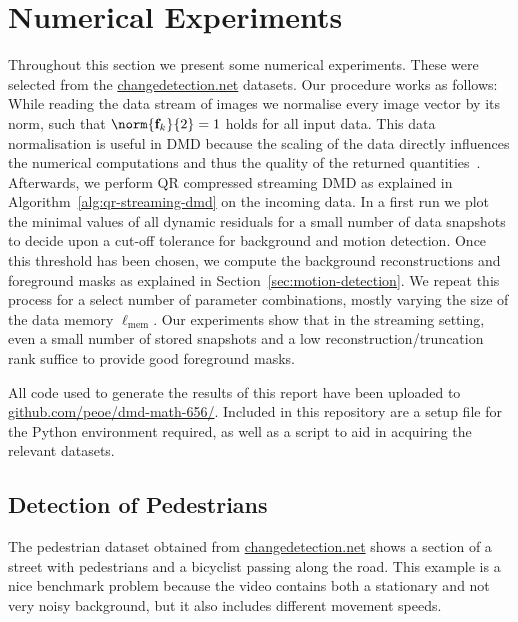 \section{Numerical Experiments}\label{sec:numerical-experiments}

Throughout this section we present some numerical experiments. These were selected from the \href{changedetection.net}{changedetection.net} datasets. Our procedure works as follows: While reading the data stream of images we normalise every image vector by its norm, such that $\norm{\bl{f}_k}{2} = 1$ holds for all input data. This data normalisation is useful in DMD because the scaling of the data directly influences the numerical computations and thus the quality of the returned quantities~\cite{Drmac2020}. Afterwards, we perform QR compressed streaming DMD as explained in Algorithm~\ref{alg:qr-streaming-dmd} on the incoming data. In a first run we plot the minimal values of all dynamic residuals for a small number of data snapshots to decide upon a cut-off tolerance for background and motion detection. Once this threshold has been chosen, we compute the background reconstructions and foreground masks as explained in Section~\ref{sec:motion-detection}. We repeat this process for a select number of parameter combinations, mostly varying the size of the data memory $\ell_\text{mem}$. Our experiments show that in the streaming setting, even a small number of stored snapshots and a low reconstruction/truncation rank suffice to provide good foreground masks.

All code used to generate the results of this report have been uploaded to \href{https://github.com/peoe/dmd-math-656/}{github.com/peoe/dmd-math-656/}. Included in this repository are a setup file for the Python environment required, as well as a script to aid in acquiring the relevant datasets.

\subsection{Detection of Pedestrians}\label{subsec:pedestrians} %

The pedestrian dataset obtained from \href{changedetection.net}{changedetection.net} shows a section of a street with pedestrians and a bicyclist passing along the road. This example is a nice benchmark problem because the video contains both a stationary and not very noisy background, but it also includes different movement speeds.

